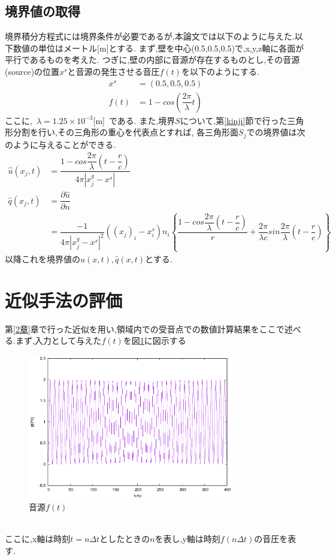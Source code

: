 \documentclass[dvipdfmx]{ampbt}
\begin{document}
\subsection{境界値の取得}
境界積分方程式には境界条件が必要であるが,本論文では以下のように与えた.以下数値の単位はメートル[m]とする.
まず,壁を中心(0.5,0.5,0.5)で,x,y,z軸に各面が平行であるものを考えた.
つぎに,壁の内部に音源が存在するものとし,その音源(source)の位置$x^s$と音源の発生させる音圧$f(t)$を以下のようにする.
\begin{align}
x^s &= (0.5,0.5,0.5)\\
\label{ef:f(t)}
f(t) &= 1-cos(\dfrac{2 \pi}{\lambda}t)
\end{align}
ここに,\ $\lambda = 1.25 \times 10^{-3}$[m]\ である.
また,境界$S$について,第\ref{kinji}節で行った三角形分割を行い,その三角形の重心を代表点とすれば,
各三角形面$S_j$での境界値は次のように与えることができる.
\begin{align}
\hat{u}(x_j,t) &= \dfrac{1-cos\dfrac{2 \pi}{\lambda}(t-\dfrac{r}{c})}{4\pi|x^g_j-x^s|} \\
\hat{q}(x_j,t) &= \dfrac{\partial \hat{u}}{\partial n} \nonumber \\
               &= \dfrac{-1}{4\pi|x^g_j-x^s|^2}((x_j)_i-x^s_i)n_i \left\{ \dfrac{1-cos\dfrac{2 \pi}{\lambda}(t-\dfrac{r}{c})}{r} + \dfrac{2\pi}{\lambda c} sin\dfrac{2\pi}{\lambda}(t-\dfrac{r}{c})  \right\}
\end{align}
以降これを境界値の$\hat{u}(x,t),\hat{q}(x,t)$とする.
\section{近似手法の評価}
第\ref{2章}章で行った近似を用い,領域内での受音点での数値計算結果をここで述べる.まず,入力として与えた$f(t)$を図\ref{fig:ft}に図示する
\begin{figure}[htbp]
  \begin{center}
    \includegraphics[clip,width=9.0cm]{./eps/ft.eps}
    \caption{音源$f(t)$}
    \label{fig:ft}
  \end{center}
\end{figure}\\
ここに,x軸は時刻$t=n\Delta t$としたときの$n$を表し,y軸は時刻$f(n\Delta t)$の音圧を表す.
\end{document}
